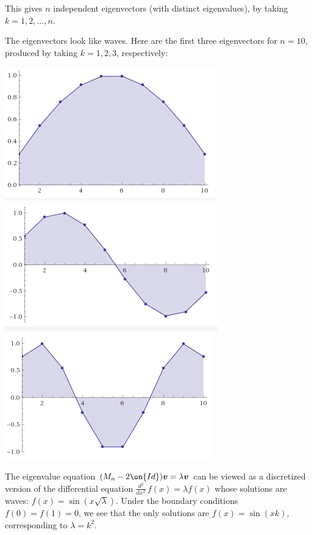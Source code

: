 \documentclass[10pt]{amsart}
\theoremstyle{mythm}
\theoremstyle{definition}
\theoremstyle{myrmk}
\begin{document}
	This gives $n$ independent eigenvectors (with distinct eigenvalues), by taking $k = 1, 2, \ldots, n$. 
	
	The eigenvectors look like waves. Here are the first three eigenvectors for $n = 10$, produced by taking $k = 1,2, 3$, respectively: 
	\begin{center}
		\includegraphics{rec11-pic1}
		\includegraphics{rec11-pic2}
		\includegraphics{rec11-pic3}
	\end{center}
	
	The eigenvalue equation $(M_n - 2\on{Id}) \bm{v} = \lambda \bm{v}$ can be viewed as a discretized version of the differential equation $\frac{d^2}{dx^2}\, f(x) = \lambda f(x)$ whose solutions are waves: $f(x) = \sin(x \sqrt{\lambda})$. Under the boundary conditions $f(0) = f(1) = 0$, we see that the only solutions are $f(x) = \sin(xk)$, corresponding to $\lambda = k^2$. 
	
\end{document}
